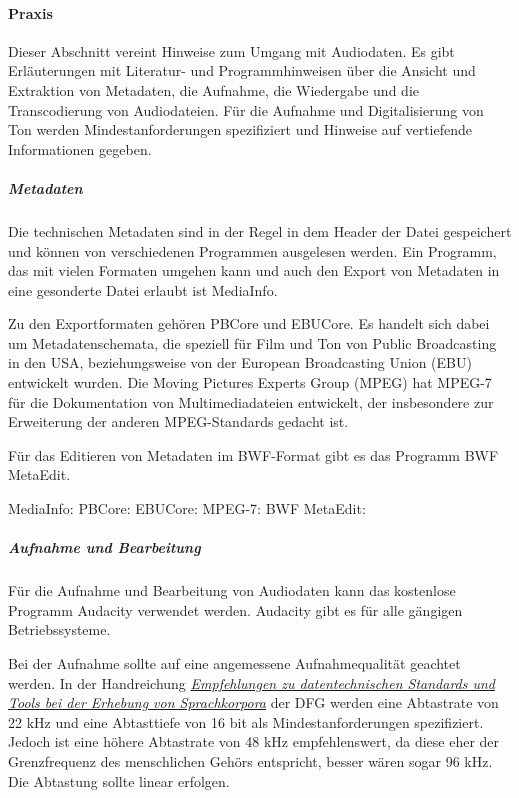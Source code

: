 

\paragraph{Praxis}
Dieser Abschnitt vereint Hinweise zum Umgang mit Audiodaten. Es gibt Erläuterungen mit Literatur- und Programmhinweisen über die Ansicht und Extraktion von Metadaten, die Aufnahme, die Wiedergabe und die Transcodierung von Audiodateien. Für die Aufnahme und Digitalisierung von Ton werden Mindestanforderungen spezifiziert und Hinweise auf vertiefende Informationen gegeben.


\subparagraph{Metadaten}Die technischen Metadaten sind in der Regel in dem Header der Datei gespeichert und können von verschiedenen Programmen ausgelesen werden. Ein Programm, das mit vielen Formaten umgehen kann und auch den Export von Metadaten in eine gesonderte Datei erlaubt ist MediaInfo.

Zu den Exportformaten gehören PBCore und EBUCore. Es handelt sich dabei um Metadatenschemata, die speziell für Film und Ton von Public Broadcasting in den USA, beziehungsweise von der European Broadcasting Union (EBU) entwickelt wurden. Die Moving Pictures Experts Group (MPEG) hat MPEG-7 für die Dokumentation von Multimediadateien entwickelt, der insbesondere zur Erweiterung der anderen MPEG-Standards gedacht ist.

Für das Editieren von Metadaten im BWF-Format gibt es das Programm BWF MetaEdit.

\begin{flushleft}
	MediaInfo: 
	PBCore: 
	EBUCore: 
	MPEG-7: 
	BWF MetaEdit: 
\end{flushleft}


\subparagraph{Aufnahme und Bearbeitung}
Für die Aufnahme und Bearbeitung von Audiodaten kann das kostenlose Programm Audacity verwendet werden. Audacity gibt es für alle gängigen Betriebssysteme.

Bei der Aufnahme sollte auf eine angemessene Aufnahmequalität geachtet werden. In der Handreichung \href{http://www.dfg.de/download/pdf/foerderung/grundlagen_dfg_foerderung/informationen_fachwissenschaften/geisteswissenschaften/standards_sprachkorpora.pdf}{\emph{Empfehlungen zu datentechnischen Standards und Tools bei der Erhebung von Sprachkorpora}} der DFG werden eine Abtastrate von 22 kHz und eine Abtasttiefe von 16 bit als Mindestanforderungen spezifiziert. Jedoch ist eine höhere Abtastrate von 48 kHz empfehlenswert, da diese eher der Grenzfrequenz des menschlichen Gehörs entspricht, besser wären sogar 96 kHz. Die Abtastung sollte linear erfolgen.


